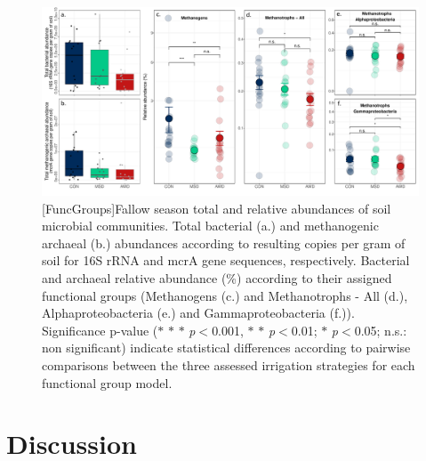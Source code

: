 \begin{figure} [ht]
\captionsetup{justification=justified}
	\centering 
	\includegraphics[scale=0.37, center]{Figures/Chapter_2/FuncGroups_plot_arr3_annot.pdf}
	[FuncGroups]{Fallow season total and relative abundances of soil microbial communities. Total bacterial (a.) and methanogenic archaeal (b.) abundances according to resulting copies per gram of soil for 16S rRNA and mcrA gene sequences, respectively. Bacterial and archaeal relative abundance (\%) according to their assigned functional groups (Methanogens (c.) and Methanotrophs - All (d.), Alphaproteobacteria (e.) and Gammaproteobacteria (f.)). Significance p-value ($\ast$ $\ast$ $\ast$ \textit{p}$<$0.001, $\ast$ $\ast$ \textit{p}$<$0.01; $\ast$ \textit{p}$<$0.05; n.s.: non significant) indicate statistical differences according to pairwise comparisons between the three assessed irrigation strategies for each functional group model.}  	\label{FuncGroups}
\end{figure}

\section{Discussion}
\label{sec:discussion}

